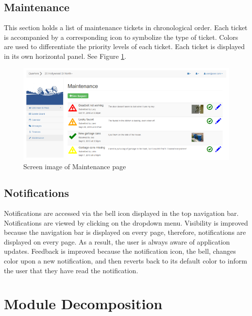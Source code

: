 \documentclass[12pt]{article}
\begin{document}
\subsection{Maintenance}
This section holds a list of maintenance tickets in chronological order. Each ticket is accompanied by a corresponding icon to symbolize the type of ticket. Colors are used to differentiate the priority levels of each ticket. Each ticket is displayed in its own horizontal panel. See Figure \ref{fig:maintenance}.

\begin{figure}
\centering
\includegraphics[width=\textwidth]{maintenance}
\caption{Screen image of Maintenance page}
\label{fig:maintenance}
\end{figure}

\subsection{Notifications}
Notifications are accessed via the bell icon displayed in the top navigation bar. Notifications are viewed by clicking on the dropdown menu. Visibility is improved because the navigation bar is displayed on every page, therefore, notifications are displayed on every page. As a result, the user is always aware of application updates. Feedback is improved because the notification icon, the bell, changes color upon a new notification, and then reverts back to its default color to inform the user that they have read the notification.

\section{Module Decomposition}
\end{document}
